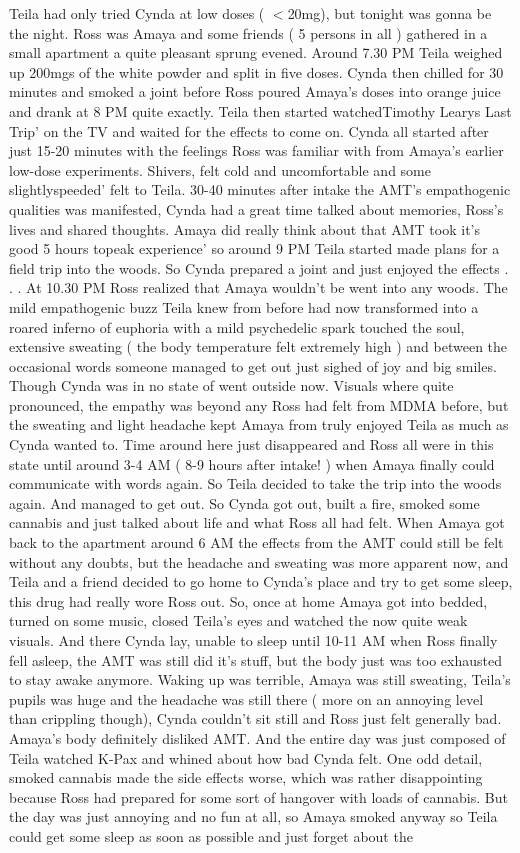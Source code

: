 \documentclass[12pt]{book}
\begin{document}
Teila had only tried Cynda at low doses ( $<$20mg), but tonight was gonna be the night. Ross was Amaya and some friends ( 5 persons in all ) gathered in a small apartment a quite pleasant sprung evened. Around 7.30 PM Teila weighed up 200mgs of the white powder and split in five doses. Cynda then chilled for 30 minutes and smoked a joint before Ross poured Amaya's doses into orange juice and drank at 8 PM quite exactly. Teila then started watchedTimothy Learys Last Trip' on the TV and waited for the effects to come on. Cynda all started after just 15-20 minutes with the feelings Ross was familiar with from Amaya's earlier low-dose experiments. Shivers, felt cold and uncomfortable and some slightlyspeeded' felt to Teila. 30-40 minutes after intake the AMT's empathogenic qualities was manifested, Cynda had a great time talked about memories, Ross's lives and shared thoughts. Amaya did really think about that AMT took it's good 5 hours topeak experience' so around 9 PM Teila started made plans for a field trip into the woods. So Cynda prepared a joint and just enjoyed the effects . . .  At 10.30 PM Ross realized that Amaya wouldn't be went into any woods. The mild empathogenic buzz Teila knew from before had now transformed into a roared inferno of euphoria with a mild psychedelic spark touched the soul, extensive sweating ( the body temperature felt extremely high ) and between the occasional words someone managed to get out just sighed of joy and big smiles. Though Cynda was in no state of went outside now. Visuals where quite pronounced, the empathy was beyond any Ross had felt from MDMA before, but the sweating and light headache kept Amaya from truly enjoyed Teila as much as Cynda wanted to. Time around here just disappeared and Ross all were in this state until around 3-4 AM ( 8-9 hours after intake! ) when Amaya finally could communicate with words again. So Teila decided to take the trip into the woods again. And managed to get out. So Cynda got out, built a fire, smoked some cannabis and just talked about life and what Ross all had felt. When Amaya got back to the apartment around 6 AM the effects from the AMT could still be felt without any doubts, but the headache and sweating was more apparent now, and Teila and a friend decided to go home to Cynda's place and try to get some sleep, this drug had really wore Ross out. So, once at home Amaya got into bedded, turned on some music, closed Teila's eyes and watched the now quite weak visuals. And there Cynda lay, unable to sleep until 10-11 AM when Ross finally fell asleep, the AMT was still did it's stuff, but the body just was too exhausted to stay awake anymore. Waking up was terrible, Amaya was still sweating, Teila's pupils was huge and the headache was still there ( more on an annoying level than crippling though), Cynda couldn't sit still and Ross just felt generally bad. Amaya's body definitely disliked AMT. And the entire day was just composed of Teila watched K-Pax and whined about how bad Cynda felt. One odd detail, smoked cannabis made the side effects worse, which was rather disappointing because Ross had prepared for some sort of hangover with loads of cannabis. But the day was just annoying and no fun at all, so Amaya smoked anyway so Teila could get some sleep as soon as possible and just forget about the 
\end{document}
